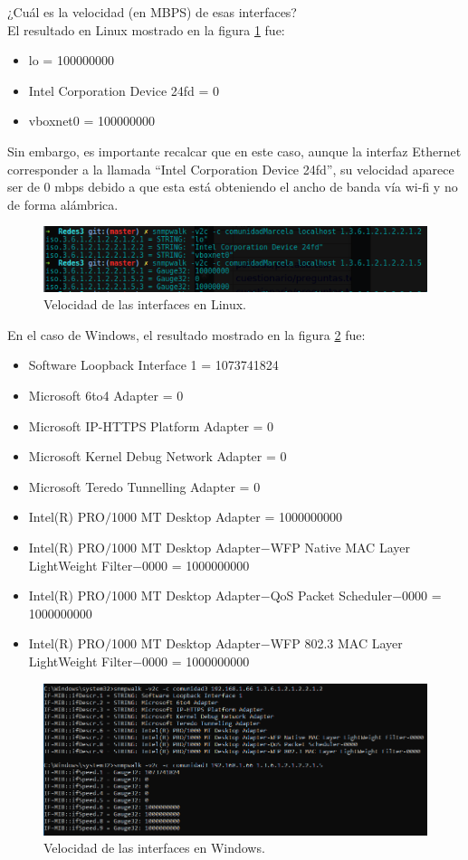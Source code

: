 \item ¿Cuál es la velocidad (en MBPS) de esas interfaces?
\\ El resultado en Linux mostrado en la figura \ref{image:velocidadInterfaces} fue:
\begin{itemize}
\item lo = 100000000
\item Intel Corporation Device 24fd = 0 
\item vboxnet0 = 100000000
\end{itemize}
Sin embargo, es importante recalcar que en este caso, aunque la interfaz Ethernet corresponder a la llamada ``Intel Corporation Device 24fd'', su velocidad aparece ser de 0 mbps debido a que esta está obteniendo el ancho de banda vía wi-fi y no de forma alámbrica.
\FloatBarrier
\begin{figure}[htbp!]
		\centering
			\includegraphics[width=.9 \textwidth]{images/Pregunta3L}
		\caption{Velocidad de las interfaces en Linux.}
		\label{image:velocidadInterfaces}
\end{figure}
\FloatBarrier

En el caso de Windows, el resultado mostrado en la figura \ref{image:velocidadInterfacesw} fue:
\begin{itemize}
\item Software Loopback Interface 1 = 1073741824
\item Microsoft 6to4 Adapter = 0
\item Microsoft IP-HTTPS Platform Adapter = 0
\item Microsoft Kernel Debug Network Adapter = 0
\item Microsoft Teredo Tunnelling Adapter = 0
\item Intel(R) PRO$/$1000 MT Desktop Adapter = 1000000000
\item Intel(R) PRO$/$1000 MT Desktop Adapter$-$WFP Native MAC Layer LightWeight Filter$-$0000 = 1000000000
\item Intel(R) PRO$/$1000 MT Desktop Adapter$-$QoS Packet Scheduler$-$0000 = 1000000000
\item Intel(R) PRO$/$1000 MT Desktop Adapter$-$WFP 802.3 MAC Layer LightWeight Filter$-$0000 = 1000000000
\end{itemize}
\FloatBarrier
\begin{figure}[htbp!]
		\centering
			\includegraphics[width=.95 \textwidth]{images/windows3}
		\caption{Velocidad de las interfaces en Windows.}
		\label{image:velocidadInterfacesw}
\end{figure}
\FloatBarrier